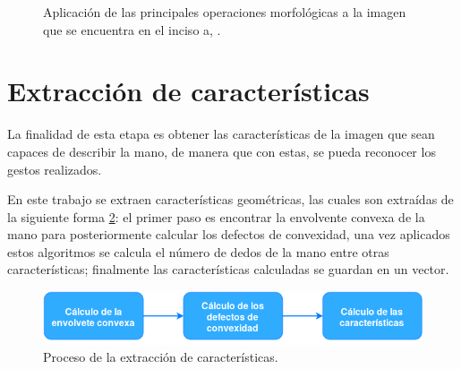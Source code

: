 \begin{figure}[h!]
\caption{Aplicación de las principales operaciones morfológicas a la imagen que se encuentra en el inciso a, \citep{Smith1999}.\quad }\label{fig:OM}
\end{figure} 






\section{Extracción de características}\label{sec:Convexhull} 

La finalidad de esta etapa es obtener las características de la imagen que sean capaces de describir la mano, de manera que con estas, se pueda reconocer los gestos realizados.
   
En este trabajo se extraen características geométricas, las cuales son extraídas de la siguiente forma \ref{fig:DiagramaExtraccionCaracteristicas}: el primer paso es encontrar la envolvente convexa de la mano para posteriormente calcular los defectos de convexidad, una vez aplicados estos algoritmos se calcula el número de dedos de la mano entre otras características; finalmente las características calculadas  se guardan en un vector.  

\begin{figure}[h!]
\begin{center}
\includegraphics[scale=.7]{./Figures/DExtraccion.png}
\end{center}
\caption{Proceso de la extracción de características.}
\label{fig:DiagramaExtraccionCaracteristicas}
\end{figure} 

